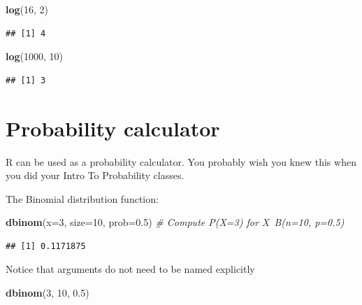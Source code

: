 \documentclass[]{book}
\newenvironment{Shaded}{\begin{snugshade}}{\end{snugshade}}
\newcommand{\KeywordTok}[1]{\textcolor[rgb]{0.13,0.29,0.53}{\textbf{#1}}}
\newcommand{\DataTypeTok}[1]{\textcolor[rgb]{0.13,0.29,0.53}{#1}}
\newcommand{\DecValTok}[1]{\textcolor[rgb]{0.00,0.00,0.81}{#1}}
\newcommand{\FloatTok}[1]{\textcolor[rgb]{0.00,0.00,0.81}{#1}}
\newcommand{\CommentTok}[1]{\textcolor[rgb]{0.56,0.35,0.01}{\textit{#1}}}
\newcommand{\NormalTok}[1]{#1}
\theoremstyle{definition}
\theoremstyle{definition}
\theoremstyle{definition}
\theoremstyle{remark}
\begin{document}
\begin{Shaded}
\begin{Highlighting}[]
\KeywordTok{log}\NormalTok{(}\DecValTok{16}\NormalTok{, }\DecValTok{2}\NormalTok{)                      }
\end{Highlighting}
\end{Shaded}

\begin{verbatim}
## [1] 4
\end{verbatim}

\begin{Shaded}
\begin{Highlighting}[]
\KeywordTok{log}\NormalTok{(}\DecValTok{1000}\NormalTok{, }\DecValTok{10}\NormalTok{)                   }
\end{Highlighting}
\end{Shaded}

\begin{verbatim}
## [1] 3
\end{verbatim}

\section{Probability calculator}\label{probability-calculator}

R can be used as a probability calculator. You probably wish you knew
this when you did your Intro To Probability classes.

The Binomial distribution function:

\begin{Shaded}
\begin{Highlighting}[]
\KeywordTok{dbinom}\NormalTok{(}\DataTypeTok{x=}\DecValTok{3}\NormalTok{, }\DataTypeTok{size=}\DecValTok{10}\NormalTok{, }\DataTypeTok{prob=}\FloatTok{0.5}\NormalTok{)  }\CommentTok{# Compute P(X=3) for X~B(n=10, p=0.5) }
\end{Highlighting}
\end{Shaded}

\begin{verbatim}
## [1] 0.1171875
\end{verbatim}

Notice that arguments do not need to be named explicitly

\begin{Shaded}
\begin{Highlighting}[]
\KeywordTok{dbinom}\NormalTok{(}\DecValTok{3}\NormalTok{, }\DecValTok{10}\NormalTok{, }\FloatTok{0.5}\NormalTok{)}
\end{Highlighting}
\end{Shaded}
\end{document}
